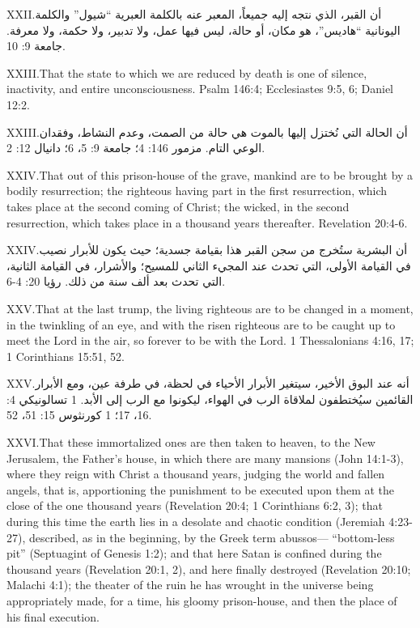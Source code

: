 \lettrine{XXII.} أن القبر، الذي نتجه إليه جميعاً، المعبر عنه بالكلمة العبرية “شيول” والكلمة اليونانية “هاديس”، هو مكان، أو حالة، ليس فيها عمل، ولا تدبير، ولا حكمة، ولا معرفة. جامعة 9: 10.


\lettrine{XXIII.} That the state to which we are reduced by death is one of silence, inactivity, and entire unconsciousness. Psalm 146:4; Ecclesiastes 9:5, 6; Daniel 12:2.


\lettrine{XXIII.} أن الحالة التي نُختزل إليها بالموت هي حالة من الصمت، وعدم النشاط، وفقدان الوعي التام. مزمور 146: 4؛ جامعة 9: 5، 6؛ دانيال 12: 2.


\lettrine{XXIV.} That out of this prison-house of the grave, mankind are to be brought by a bodily resurrection; the righteous having part in the first resurrection, which takes place at the second coming of Christ; the wicked, in the second resurrection, which takes place in a thousand years thereafter. Revelation 20:4-6.


\lettrine{XXIV.} أن البشرية ستُخرج من سجن القبر هذا بقيامة جسدية؛ حيث يكون للأبرار نصيب في القيامة الأولى، التي تحدث عند المجيء الثاني للمسيح؛ والأشرار، في القيامة الثانية، التي تحدث بعد ألف سنة من ذلك. رؤيا 20: 4-6.


\lettrine{XXV.} That at the last trump, the living righteous are to be changed in a moment, in the twinkling of an eye, and with the risen righteous are to be caught up to meet the Lord in the air, so forever to be with the Lord. 1 Thessalonians 4:16, 17; 1 Corinthians 15:51, 52.


\lettrine{XXV.} أنه عند البوق الأخير، سيتغير الأبرار الأحياء في لحظة، في طرفة عين، ومع الأبرار القائمين سيُختطفون لملاقاة الرب في الهواء، ليكونوا مع الرب إلى الأبد. 1 تسالونيكي 4: 16، 17؛ 1 كورنثوس 15: 51، 52.


\lettrine{XXVI.} That these immortalized ones are then taken to heaven, to the New Jerusalem, the Father’s house, in which there are many mansions (John 14:1-3), where they reign with Christ a thousand years, judging the world and fallen angels, that is, apportioning the punishment to be executed upon them at the close of the one thousand years (Revelation 20:4; 1 Corinthians 6:2, 3); that during this time the earth lies in a desolate and chaotic condition (Jeremiah 4:23-27), described, as in the beginning, by the Greek term abussos— “bottom-less pit” (Septuagint of Genesis 1:2); and that here Satan is confined during the thousand years (Revelation 20:1, 2), and here finally destroyed (Revelation 20:10; Malachi 4:1); the theater of the ruin he has wrought in the universe being appropriately made, for a time, his gloomy prison-house, and then the place of his final execution.


